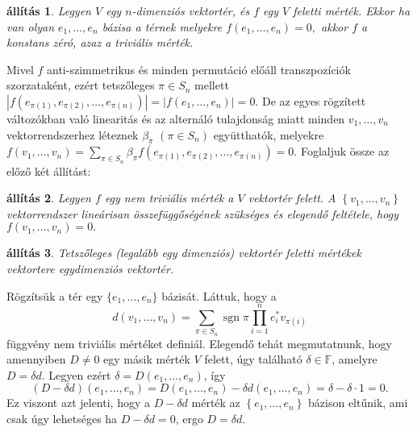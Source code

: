 \documentclass[9pt, a4paper, showtrims]{memoir}
\makeatletter
\renewenvironment{proof}[1][\proofname]
    {\par\pushQED{\qed}%
    \normalfont \topsep6\p@\@plus6\p@\relax
    \trivlist
    \item[\hskip\labelsep
        \itshape
    #1\@addpunct{:}]\ignorespaces}
    {\popQED\endtrivlist\@endpefalse}
\theoremstyle{plain}
\newtheorem{proposition}{állítás}[chapter]
\theoremstyle{remark}
\theoremstyle{definition}
\DeclareMathOperator{\sgn}{sgn}
\makeatother
\begin{document}
\begin{proposition}
    Legyen $V$ egy $n$-dimenziós vektortér, és $f$ egy $V$ feletti mérték. 
    Ekkor ha van olyan $e_{1},\ldots ,e_{n}$ bázisa a térnek melyekre 
    \(
    f\left( e_{1},\ldots ,e_{n}\right) 
    =
    0,
    \)
    akkor $f$ a konstans zéró, azaz a triviális mérték.
\end{proposition}
\begin{proof}
    Mivel $f$ anti-szimmetrikus és minden permutáció előáll transzpozíciók szorzataként, 
    ezért tetszőleges $\pi \in S_{n}$ mellett 
    $\left| f\left(e_{\pi \left( 1\right) },e_{\pi \left( 2\right) },\ldots ,e_{\pi \left(n\right) }\right) \right| 
    =
    \left| f\left( e_{1},\ldots ,e_{n}\right) \right|
    =
    0.
    $ 
    De az egyes rögzített változókban való linearitás és az alternáló tulajdonság miatt minden 
    $v_{1},\ldots ,v_{n}$ vektorrendszerhez léteznek 
    $\beta _{\pi }$ $\left( \pi \in S_{n}\right) $ együtthatók, 
    melyekre 
    $f\left(v_{1},\ldots ,v_{n}\right) 
    =
    \sum_{\pi \in S_{n}}\beta _{\pi }f\left( e_{\pi\left( 1\right) },e_{\pi \left( 2\right) },\ldots ,e_{\pi \left( n\right)}\right) 
    =
    0.$
\end{proof}
Foglaljuk össze az előző két állítást:
\begin{proposition}
    Legyen $f$ egy nem triviális mérték a $V$ vektortér felett. A
    \begin{math}
        \left\{ v_1,\dots,v_n \right\}
    \end{math}
    vektorrendszer lineárisan összefüggőségének szükséges és elegendő feltétele, 
    hogy 
    \begin{math}
        f\left( v_1,\dots,v_n \right)
        =
        0.
    \end{math}
\end{proposition}

\begin{proposition}
    Tetszőleges (legalább egy dimenziós) vektortér feletti mértékek vektortere egydimenziós vektortér.
\end{proposition}
\begin{proof}
    Rögzítsük a tér egy $\{e_{1},\ldots ,e_{n}\}$ bázisát. 
    Láttuk, hogy a 
    \[
        d\left(v_{1},\ldots ,v_{n}\right)
        =
        \sum_{\pi \in S_{n}}\sgn\pi\prod_{i=1}^ne_i^\ast v_{\pi\left( i\right)}
    \]
    függvény nem triviális mértéket definiál. 
    Elegendő tehát megmutatnunk, 
    hogy amennyiben $D\neq 0$ egy másik mérték $V$ felett,
    úgy található 
    $\delta\in \mathbb{F}$,
    amelyre 
    $D=\delta d.$ 
    Legyen ezért 
    $\delta
    =
    D\left( e_{1},\ldots,e_{n}\right)
    $, 
    így 
    \[
        \left( D-\delta d \right)\left( e_1,\dots,e_n \right)
        =
        D\left( e_{1},\ldots ,e_{n}\right) -\delta d\left(e_{1},\ldots ,e_{n}\right) 
        =
        \delta-\delta\cdot 1
        =
        0.
    \] 
    Ez viszont azt jelenti, 
    hogy a $D-\delta d$ mérték az  $\left\{e_{1},\ldots ,e_{n}  \right\}$ 
    bázison eltűnik,
    ami csak úgy lehetséges ha 
    $D-\delta d=0$,
    ergo
    \begin{math}
        D=\delta d.
    \end{math}
\end{proof}
\end{document}
